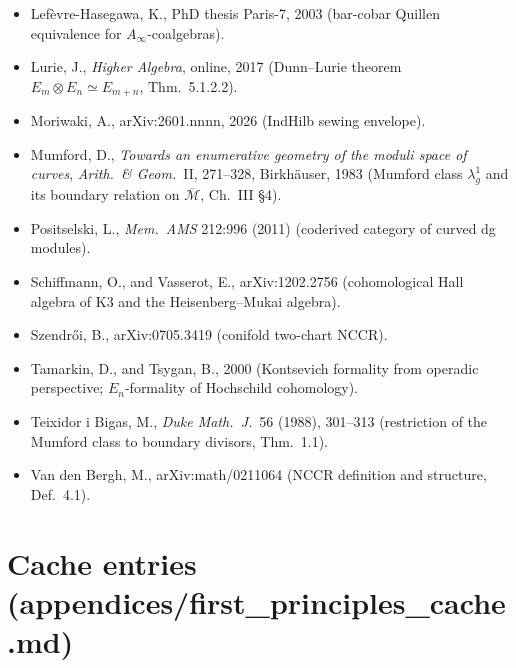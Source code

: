 \documentclass[11pt]{amsart}
\newcommand{\Mbar}{\overline{\mathcal{M}}}
\begin{document}
\begin{itemize}
\item Lef\`evre-Hasegawa, K., PhD thesis Paris-7, 2003 (bar-cobar
Quillen equivalence for $A_\infty$-coalgebras).
\item Lurie, J., \emph{Higher Algebra}, online, 2017 (Dunn--Lurie
theorem $E_m \otimes E_n \simeq E_{m+n}$, Thm.~5.1.2.2).
\item Moriwaki, A., arXiv:2601.nnnn, 2026 (IndHilb sewing envelope).
\item Mumford, D., \emph{Towards an enumerative geometry of the
moduli space of curves}, \emph{Arith.\ \& Geom.}\ II, 271--328,
Birkhäuser, 1983 (Mumford class $\lambda_g^1$ and its boundary
relation on $\Mbar$, Ch.~III \S 4).
\item Positselski, L., \emph{Mem.\ AMS} 212:996 (2011) (coderived
category of curved dg modules).
\item Schiffmann, O., and Vasserot, E., arXiv:1202.2756 (cohomological
Hall algebra of K3 and the Heisenberg--Mukai algebra).
\item Szendrői, B., arXiv:0705.3419 (conifold two-chart NCCR).
\item Tamarkin, D., and Tsygan, B., 2000 (Kontsevich formality from
operadic perspective; $E_n$-formality of Hochschild cohomology).
\item Teixidor i Bigas, M., \emph{Duke Math.\ J.}\ 56 (1988), 301--313
(restriction of the Mumford class to boundary divisors, Thm.\ 1.1).
\item Van den Bergh, M., arXiv:math/0211064 (NCCR definition and
structure, Def.\ 4.1).
\end{itemize}

\section*{Cache entries (appendices/first\_principles\_cache.md)}
\end{document}
